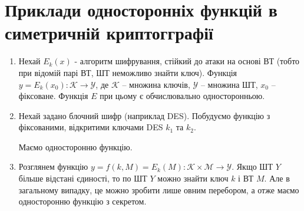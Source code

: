 \section{Приклади односторонніх функцій в симетричній криптогграфії}
\begin{enumerate}
\item 
Нехай $E_{k}(x)$ - алгоритм шифрування, стійкий до атаки на основі ВТ (тобто при відомій парі ВТ, ШТ неможливо знайти ключ). 
Функція $y=E_{k}(x_{0}):\mathcal K \to \mathcal Y$, де $\mathcal K$ -- множина ключів, $\mathcal Y$ -- множина ШТ, $x_{0}$ -- фіксоване. 
Функція $E$ при цьому є обчислювально односторонньою.
\item 
Нехай задано блочний шифр (наприклад DES). Побудуємо функцію з фіксованими, відкритими ключами DES $k_{1}$ та $k_{2}$.\par
\begin{figure}[h]
\end{figure} 
Маємо односторонню функцію.
\item 
Розглянем функцію $y=f(k,M)=E_{k}(M): \mathcal K \times \mathcal M \to \mathcal Y$. Якщо ШТ $Y$ більше
відстані єдиності, то по ШТ $Y$ можно знайти ключ $k$ і ВТ $M$. Але в загальному випадку, це можно зробити
лише овним перебором, а отже маємо односторонню функцію з секретом. 
\end{enumerate}
